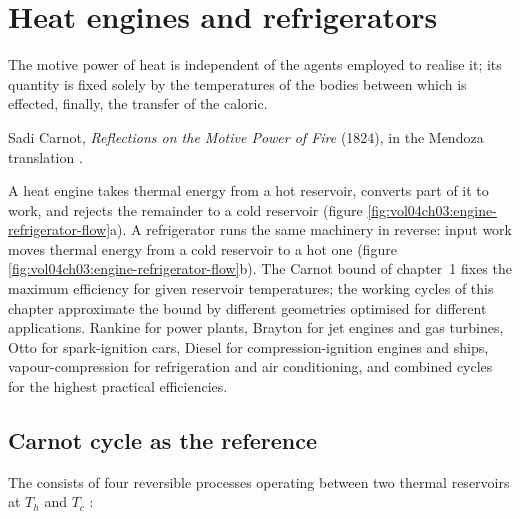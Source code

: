 \chapter{Heat engines and refrigerators}
\label{vol04:ch03}

\epigraph{The motive power of heat is independent of the agents
employed to realise it; its quantity is fixed solely by the temperatures
of the bodies between which is effected, finally, the transfer of the
caloric.}{Sadi Carnot, \emph{Reflections on the Motive Power of Fire}
(1824), in the Mendoza translation
\cite[p.~20]{hist:carnot1824}.}


\noindent
A heat engine takes thermal energy from a hot reservoir, converts part
of it to work, and rejects the remainder to a cold reservoir
(figure \ref{fig:vol04ch03:engine-refrigerator-flow}a). A
refrigerator runs the same machinery in reverse: input work moves
thermal energy from a cold reservoir to a hot one
(figure \ref{fig:vol04ch03:engine-refrigerator-flow}b). The Carnot bound
of chapter~1 fixes the maximum efficiency for given reservoir
temperatures; the working cycles of this chapter approximate the bound
by different geometries optimised for different applications. Rankine
for power plants, Brayton for jet engines and gas turbines, Otto for
spark-ignition cars, Diesel for compression-ignition engines and
ships, vapour-compression for refrigeration and air conditioning, and
combined cycles for the highest practical efficiencies.



\section{Carnot cycle as the reference}

The  consists of four reversible processes
operating between two thermal reservoirs at $T_h$ and $T_c$
\cite{hist:carnot1824}:

